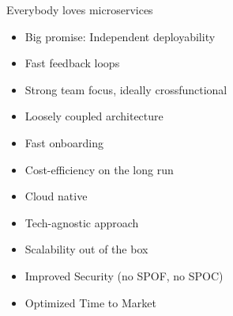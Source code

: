 \begin{frame}{Everybody loves microservices}
            \begin{itemize}[<+->]
            \item Big promise: Independent deployability
            \item Fast feedback loops
            \item Strong team focus, ideally crossfunctional
            \item Loosely coupled architecture
            \item Fast onboarding
            \item Cost-efficiency on the long run
            \item Cloud native
            \item Tech-agnostic approach
            \item Scalability out of the box
            \item Improved Security (no SPOF, no SPOC)
            \item Optimized Time to Market
            \end{itemize}
\end{frame}

